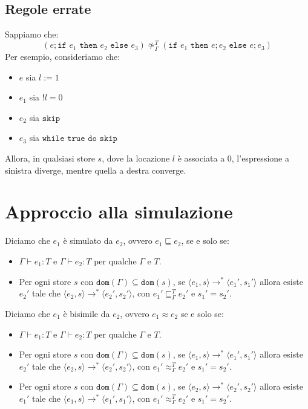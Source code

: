 \subsection{Regole errate}
Sappiamo che:
\[
  (e;\texttt{if }e_1\texttt{ then }e_2\texttt{ else }e_3) \not \simeq_\Gamma^T
  (\texttt{if }e_1\texttt{ then }e;e_2\texttt{ else }e;e_3)  
\]
Per esempio, consideriamo che:
\begin{itemize}
    \item $e$ sia $l := 1$
    \item $e_1$ sia $!l = 0$
    \item $e_2$ sia $\texttt{skip}$
    \item $e_3$ sia $\texttt{while true do skip}$
\end{itemize}
Allora, in qualsiasi store $s$, dove la locazione $l$ è associata a $0$, 
l'espressione a sinistra diverge, mentre quella a destra converge.
\section{Approccio alla simulazione}
\begin{tcolorbox}[title = Simulazione]
    Diciamo che $e_1$ è simulato da $e_2$, ovvero $e_1 \sqsubseteq e_2$,
    se e solo se:
    \begin{itemize}
        \item $\Gamma \vdash e_1 : T$ e $\Gamma \vdash e_2 : T$
        per qualche $\Gamma$ e $T$.
        \item Per ogni store $s$ con $\texttt{dom}(\Gamma) \subseteq \texttt{dom}(s)$,
        se $\langle e_1, s \rangle \rightarrow^* \langle e_1', s_1' \rangle$ allora
        esiste $e_2'$ tale che $\langle e_2, s \rangle
        \rightarrow^* \langle e_2', s_2' \rangle$, con $e_1' \sqsubseteq_\Gamma^T e_2'$
        e $s_1' = s_2'$.
    \end{itemize}
\end{tcolorbox}
\begin{tcolorbox}[title = Bisimulazione]
    Diciamo che $e_1$ è bisimile da $e_2$, ovvero $e_1 \approx e_2$ se e solo se:
    \begin{itemize}
        \item $\Gamma \vdash e_1 : T$ e $\Gamma \vdash e_2 : T$
        per qualche $\Gamma$ e $T$.
        \item Per ogni store $s$ con $\texttt{dom}(\Gamma) \subseteq \texttt{dom}(s)$,
        se $\langle e_1, s \rangle \rightarrow^* \langle e_1', s_1' \rangle$ allora
        esiste $e_2'$ tale che $\langle e_2, s \rangle
        \rightarrow^* \langle e_2', s_2' \rangle$, con $e_1' \approx_\Gamma^T e_2'$
        e $s_1' = s_2'$.
        \item Per ogni store $s$ con $\texttt{dom}(\Gamma) \subseteq \texttt{dom}(s)$,
        se $\langle e_2, s \rangle \rightarrow^* \langle e_2', s_2' \rangle$ allora
        esiste $e_1'$ tale che $\langle e_1, s \rangle \rightarrow^* \langle e_1', s_1' \rangle$,
        con $e_1' \approx_\Gamma^T e_2'$ e $s_1' = s_2'$.
    \end{itemize}
\end{tcolorbox}